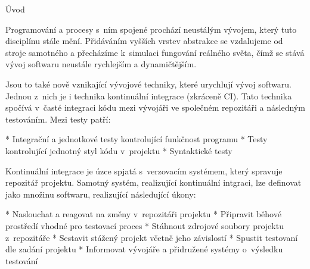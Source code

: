 \chap Úvod

Programování a procesy s~ním spojené prochází neustálým vývojem, který tuto disciplínu stále mění. 
Přidáváním vyšších vrstev abstrakce se vzdalujeme od stroje samotného a přecházíme k~simulaci fungování reálného světa, čímž se stává vývoj softwaru neustále rychlejším a dynamičtějším. 


Jsou to také nově vznikající vývojové techniky, které urychlují vývoj softwaru.
Jednou z~nich je i technika kontinuální integrace (zkráceně CI). Tato technika spočívá v~časté integraci kódu mezi vývojáři ve společném repozitáři a následným testováním. Mezi testy patří:

\begitems
* Integrační a jednotkové testy kontrolující funkčnost programu
* Testy kontrolující jednotný styl kódu v~projektu
* Syntaktické testy
\enditems

Kontinuální integrace je úzce spjatá s~verzovacím systémem, který spravuje repozitář projektu. Samotný systém, realizující kontinuální intgraci, lze definovat jako množinu softwaru, realizující následující úkony:

\begitems
* Naslouchat a reagovat na změny v~repozitáři projektu
* Připravit běhové prostředí vhodné pro testovací proces
* Stáhnout zdrojové soubory projektu z~repozitáře
* Sestavit stážený projekt včetně jeho závislostí
* Spustit testovaní dle zadání projektu
* Informovat vývojáře a přidružené systémy o~výsledku testování
\enditems



